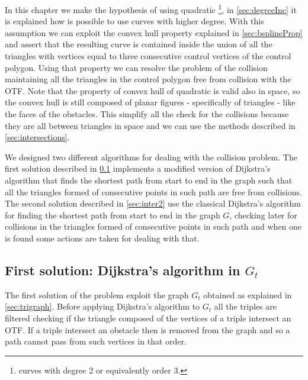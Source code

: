 \documentclass[dissertation.tex]{subfiles}
\begin{document}
In this chapter we make the hypothesis of using
quadratic \bss\footnote{\bss curves with degree 2 or equivalently order 3.}, in
\cref{sec:degreeInc} it is explained how is possible to use curves with
higher degree. With this assumption we can exploit the convex hull
property explained in \cref{sec:bsplineProp} and assert that the
resulting curve is contained inside the union of all the triangles
with vertices equal to three consecutive control vertices of the control
polygon. Using that property we can resolve the problem of the
collision maintaining all the triangles in the control polygon free
from collision with the \ac{OTF}. Note that the property of convex
hull of quadratic
\bss is valid also in space, so the convex hull is still composed
of planar figures - specifically of triangles - like the faces of the
obstacles. This simplify all the check for the collisions because they
are all between triangles in space and we can use the methods
described in \cref{sec:intersections}.

We designed two different algorithms for dealing with the collision
problem. The first solution described in \cref{sec:inter1} implements
a modified version of Dijkstra's
algorithm that finds the shortest path from start to end in the graph
such that all the triangles formed of consecutive points in such path
are free from collisions. The second solution described in
\cref{sec:inter2} use the classical Dijkstra's algorithm for finding
the shortest path from start to end in the graph $G$, checking later for
collisions in the triangles formed of consecutive points in such path
and when one is found some actions are taken for dealing with that.

\subsection{First solution: Dijkstra's algorithm in $G_t$}\label{sec:inter1}
The first solution of the problem exploit the graph $G_t$ obtained as
explained in \cref{sec:trigraph}. Before applying Dijkstra's algorithm
to $G_t$ all the triples are filtered checking if the
triangle composed of the vertices of a triple intersect an
\ac{OTF}. If a triple intersect an obstacle then is removed from the
graph
and so a path cannot pass from such vertices in that order.
\end{document}
